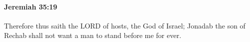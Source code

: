 
		\paragraph{Jeremiah 35:19} %
			\label{JEREMIAH-35-19}

			Therefore thus saith the LORD of hosts, the God of Israel; Jonadab the son of Rechab shall not want a man to stand before me for ever.

